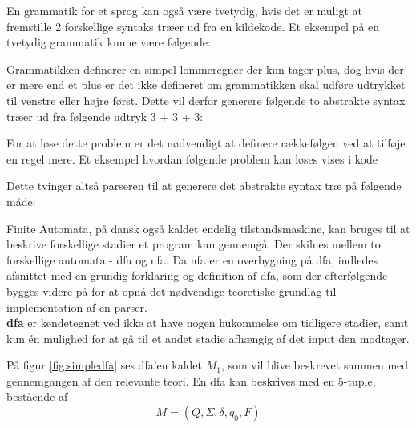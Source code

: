 

En grammatik for et sprog kan også være tvetydig, hvis det er muligt at fremstille 2 forskellige syntaks træer ud fra en kildekode. Et eksempel på en tvetydig grammatik kunne være følgende:




Grammatikken definerer en simpel lommeregner der kun tager plus, dog hvis der er mere end et plus er det ikke defineret om grammatikken skal udføre udtrykket til venstre eller højre først. Dette vil derfor generere følgende to abstrakte syntax træer ud fra følgende udtryk 3 + 3 + 3:

For at løse dette problem er det nødvendigt at definere rækkefølgen ved at tilføje en regel mere. Et eksempel hvordan følgende problem kan løses vises i kode 


Dette tvinger altså parseren til at generere det abstrakte syntax træ på følgende måde:

Finite Automata, på dansk også kaldet endelig tilstandsmaskine, kan bruges til at beskrive forskellige stadier et program kan gennemgå. Der skilnes mellem to forskellige automata - \gls{dfa} og \gls{nfa}. Da \gls{nfa} er en overbygning på \gls{dfa}, indledes afsnittet med en grundig forklaring og definition af \gls{dfa}, som der efterfølgende bygges videre på for at opnå det nødvendige teoretiske grundlag til implementation af en parser.\\

\noindent \textbf{\gls{dfa}} er kendetegnet ved ikke at have nogen hukommelse om tidligere stadier, samt kun én mulighed for at gå til et andet stadie afhængig af det input den modtager.


\noindent På figur \ref{fig:simpledfa} ses \gls{dfa}'en kaldet $M_1$, som vil blive beskrevet sammen med gennemgangen af den relevante teori. En \gls{dfa} kan beskrives med en 5-tuple, bestående af \[M = (Q, \Sigma, \delta, q_0, F)\]

